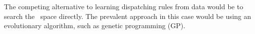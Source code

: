\documentclass[twocolumn]{svjour3}
\begin{document}

The competing alternative to learning dispatching rules from data would be to 
search the \dr\ space directly. The prevalent approach in this case would be 
using an evolutionary algorithm, such as genetic programming (GP). 
%
\end{document}
